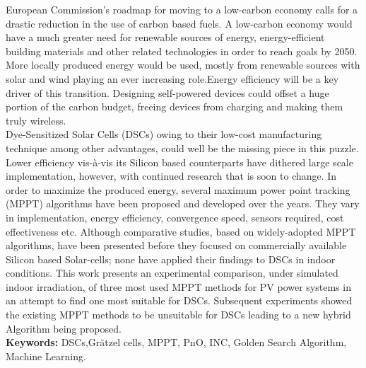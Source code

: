  European Commission's roadmap for moving to a low-carbon economy calls for a drastic reduction in the use of carbon based fuels. A low-carbon economy would have a much greater need for renewable sources of energy, energy-efficient building materials and other related technologies in order to reach  goals by 2050. More locally produced energy would be used, mostly from renewable sources with solar and wind playing an ever increasing role.Energy efficiency will be a key driver of this transition. Designing self-powered devices could offset a huge portion of the carbon budget, freeing devices from charging and making them truly wireless. \\
 
  Dye-Sensitized Solar Cells (DSCs) owing to their low-cost manufacturing technique among other advantages, could well be the missing piece in this puzzle. Lower efficiency vis-à-vis its Silicon based counterparts have dithered large scale implementation, however, with continued research that is soon to change. In order to  maximize the produced energy, several maximum power point tracking (MPPT) algorithms have been proposed and developed over the years. They vary in implementation, energy efficiency, convergence speed, sensors required, cost effectiveness etc. Although comparative studies, based on widely-adopted MPPT algorithms, have been presented before they focused on commercially available Silicon based Solar-cells; none have applied their findings to DSCs in indoor conditions. This work presents an experimental comparison, under simulated indoor irradiation, of three most used MPPT methods for PV power systems in an attempt to find one most suitable for DSCs. Subsequent experiments showed the existing MPPT methods to be unsuitable for DSCs leading to a new hybrid Algorithm being proposed.\\       

{\bf Keywords:} DSCs,Grätzel cells, MPPT, PnO, INC, Golden Search Algorithm, Machine Learning. 
\acresetall
